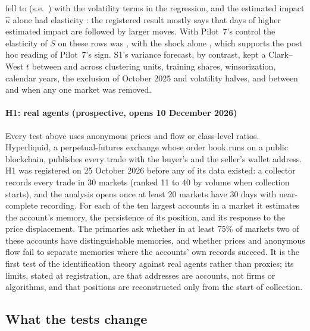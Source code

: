 fell to \RobRVolE{} (s.e.\ \RobRVolSE) with the volatility terms in the regression, and the estimated impact $\hat\kappa$ alone had elasticity \RobRKappaE{}: the registered result mostly says that days of higher estimated impact are followed by larger moves. With Pilot~7's control the elasticity of $S$ on these rows was \RobRSPsevenE{}, with the shock alone \RobRSShockE{}, which supports the post hoc reading of Pilot~7's sign. S1's variance forecast, by contrast, kept a Clark--West $t$ between \RobSYrAT{} and \RobSWinsT{} across clustering units, training shares, winsorization, calendar years, the exclusion of October 2025 and volatility halves, and between \RobSLooMin{} and \RobSLooMax{} when any one market was removed.

\paragraph{H1: real agents (prospective, opens 10 December 2026)} Every test above uses anonymous prices and flow or class-level ratios. Hyperliquid, a perpetual-futures exchange whose order book runs on a public blockchain, publishes every trade with the buyer's and the seller's wallet address. H1 was registered on 25 October 2026 before any of its data existed: a collector records every trade in 30 markets (ranked 11 to 40 by volume when collection starts), and the analysis opens once at least 20 markets have 30 days with near-complete recording. For each of the ten largest accounts in a market it estimates the account's memory, the persistence of its position, and its response to the price displacement. The primaries ask whether in at least 75\% of markets two of these accounts have distinguishable memories, and whether prices and anonymous flow fail to separate memories where the accounts' own records succeed. It is the first test of the identification theory against real agents rather than proxies; its limits, stated at registration, are that addresses are accounts, not firms or algorithms, and that positions are reconstructed only from the start of collection.

\subsection{What the tests change}\label{sec:ev_change}

